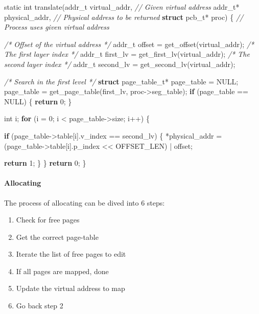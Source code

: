 \documentclass[]{article}
\newenvironment{Shaded}{}{}
\newcommand{\KeywordTok}[1]{\textcolor[rgb]{0.00,0.44,0.13}{\textbf{#1}}}
\newcommand{\DataTypeTok}[1]{\textcolor[rgb]{0.56,0.13,0.00}{#1}}
\newcommand{\DecValTok}[1]{\textcolor[rgb]{0.25,0.63,0.44}{#1}}
\newcommand{\CommentTok}[1]{\textcolor[rgb]{0.38,0.63,0.69}{\textit{#1}}}
\newcommand{\ControlFlowTok}[1]{\textcolor[rgb]{0.00,0.44,0.13}{\textbf{#1}}}
\newcommand{\NormalTok}[1]{#1}
\providecommand{\tightlist}{%
  \setlength{\itemsep}{0pt}\setlength{\parskip}{0pt}}
\let\oldparagraph\paragraph
\renewcommand{\paragraph}[1]{\oldparagraph{#1}\mbox{}}
\begin{document}
\begin{Shaded}
\begin{Highlighting}[]
\DataTypeTok{static} \DataTypeTok{int}\NormalTok{ translate(addr_t virtual_addr,   }\CommentTok{// Given virtual address}
\NormalTok{                     addr_t* physical_addr, }\CommentTok{// Physical address to be returned}
                     \KeywordTok{struct}\NormalTok{ pcb_t* proc) \{ }\CommentTok{// Process uses given virtual address}

        \CommentTok{/* Offset of the virtual address */}
\NormalTok{        addr_t offset = get_offset(virtual_addr);}
        \CommentTok{/* The first layer index */}
\NormalTok{        addr_t first_lv = get_first_lv(virtual_addr);}
        \CommentTok{/* The second layer index */}
\NormalTok{        addr_t second_lv = get_second_lv(virtual_addr);}


        \CommentTok{/* Search in the first level */}
        \KeywordTok{struct}\NormalTok{ page_table_t* page_table = NULL;}
\NormalTok{        page_table = get_page_table(first_lv, proc->seg_table);}
        \ControlFlowTok{if}\NormalTok{ (page_table == NULL) \{}
                \ControlFlowTok{return} \DecValTok{0}\NormalTok{;}
\NormalTok{        \}}

        \DataTypeTok{int}\NormalTok{ i;}
        \ControlFlowTok{for}\NormalTok{ (i = }\DecValTok{0}\NormalTok{; i < page_table->size; i++) \{}

                \ControlFlowTok{if}\NormalTok{ (page_table->table[i].v_index == second_lv) \{}
\NormalTok{                        *physical_addr =}
\NormalTok{                            (page_table->table[i].p_index << OFFSET_LEN) |}
\NormalTok{                            offset;}

                        \ControlFlowTok{return} \DecValTok{1}\NormalTok{;}
\NormalTok{                \}}
\NormalTok{        \}}
        \ControlFlowTok{return} \DecValTok{0}\NormalTok{;}
\NormalTok{\}}
\end{Highlighting}
\end{Shaded}

\paragraph{Allocating}\label{allocating}

The process of allocating can be dived into 6 steps:

\begin{enumerate}
\def\labelenumi{\arabic{enumi}.}
\tightlist
\item
  Check for free pages
\item
  Get the correct page-table
\item
  Iterate the list of free pages to edit
\item
  If all pages are mapped, done
\item
  Update the virtual address to map
\item
  Go back step 2
\end{enumerate}
\end{document}
